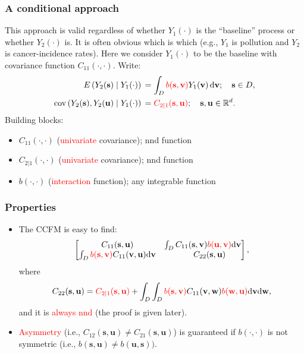 \documentclass{beamer}
\newcommand{\svec} {\textbf{s}}
\newcommand{\uvec} {\textbf{u}}
\newcommand{\s}{\mathbf{s}}
\renewcommand{\v}{\mathbf{v}}
\renewcommand{\u}{\mathbf{u}}
\newcommand{\w}{\mathbf{w}}
\renewcommand{\d}{\mathrm{d}}
\newcommand{\E}{E}
\newcommand{\cov}{\mathrm{cov}}
\newcommand{\red}{\textcolor{red}}%
\begin{document}

\begin{frame}
\frametitle{A conditional approach}
This approach is valid regardless of whether $Y_1(\cdot)$ is the ``baseline'' process or whether $Y_2(\cdot)$ is. It is often obvious which is which (e.g., $Y_1$ is pollution and $Y_2$ is cancer-incidence rates). Here we consider $Y_1(\cdot)$ to be the baseline with covariance function $C_{11}(\cdot,\cdot)$. Write:
\begin{align*}
\E\left(Y_2(\s)\mid Y_1(\cdot)\right)&\,=\int_D{\textcolor{red}{b(\s,\v)}Y_1(\v)\,\d \v};\quad \s\in D,\\
\cov\left(Y_2(\s),Y_2(\u)\mid Y_1(\cdot)\right)&\,=\textcolor{red}{C_{2\mid 1}(\s,\u)};\quad \s,\u\in \mathbb{R}^d.
\end{align*}
Building blocks:
\begin{itemize}
\item $C_{11}(\cdot,\cdot)$ (\textcolor{red}{univariate} covariance); nnd function
\item $C_{2|1}(\cdot,\cdot)$ (\textcolor{red}{univariate} covariance); nnd function
\item $b(\cdot,\cdot)$ (\textcolor{red}{interaction} function); any integrable function
\end{itemize}
\end{frame}


\begin{frame}
\frametitle{Properties}
\begin{itemize}
\item The CCFM is easy to find:
$$
\begin{bmatrix} C_{11}(\s,\u) & \int_DC_{11}(\s,\v)\textcolor{red}{b(\u,\v)}\d\v \\ \int_D\textcolor{red}{b(\s,\v)}C_{11}(\v,\u)\d\v & ~~~~~C_{22}(\s,\u)\end{bmatrix},
$$
where 
$$
C_{22}(\s,\u) = \textcolor{red}{C_{2\mid 1}(\s,\u)}+\int_D\int_D \red{b(\s,\v)}C_{11}(\v,\w) \red{b(\w,\u)}\d\v\d\w,
$$
and it is \textcolor{red}{always nnd} (the proof is given later). \vfill

\item \textcolor{red}{Asymmetry} (i.e., $C_{12}(\svec,\uvec) \ne C_{21}(\svec,\uvec)$) is guaranteed if $b(\cdot,\cdot)$ is not symmetric (i.e., $b(\s,\u)\neq b(\u,\s))$.\vfill
\end{itemize}
\end{frame}
\end{document}
